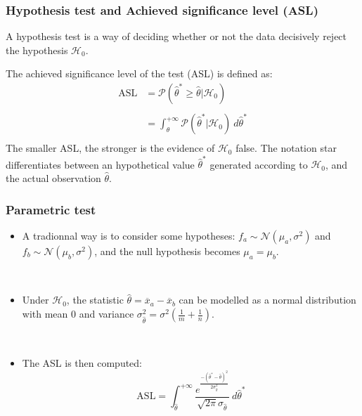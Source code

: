 \frame
{
\frametitle{Hypothesis  test and Achieved significance level (ASL)}

\begin{definition}
A \alert{hypothesis test} is a way of deciding whether or not the data decisively reject the hypothesis $\mathcal{H}_0$. 
\end{definition}

\begin{definition}
The \alert{achieved significance level} of the test (ASL) is defined as:
$$
\begin{array}{ll}
\mathrm{ASL}&= \pmb{\mathcal{P}}(\hat{\theta}^{*}\geq \hat{\theta}|\mathcal{H}_0)\\
&\\
&=\int^{+\infty}_{\hat{\theta}} \mathcal{P}(\hat{\theta}^{*}|\mathcal{H}_0) \ d\hat{\theta}^{*}\\
\end{array}
$$ 
The smaller ASL, the stronger is the evidence of  $\mathcal{H}_0$ false. The notation star differentiates between  an hypothetical value $\hat{\theta}^{*}$ generated according to $\mathcal{H}_0$, and the actual observation $\hat{\theta}$.
\end{definition}
}
\frame
{
\frametitle{Parametric test}

\begin{itemize}

\item A tradionnal way is to consider some hypotheses: $f_a \sim \mathcal{N}(\mu_a, \sigma^2)$ and $f_b \sim \mathcal{N}(\mu_b, \sigma^2)$, and the null hypothesis becomes $\mu_a=\mu_b$. 

\

\item Under $\mathcal{H}_{0}$, the statistic $\hat{\theta}=\overline{x}_a-\overline{x}_b$ can be modelled as a normal distribution with mean 0 and variance $\sigma^2_{\hat{\theta}}=\sigma^2 (\frac{1}{m}+\frac{1}{n})$. 

\

\item The ASL is then computed:
$$
\mathrm{ASL}= \int^{+\infty}_{\hat{\theta}} 
\frac{
e^{ \frac{- (\hat{\theta}^{*}-\hat{\theta} )^{2} } {2\sigma^2_{\hat{\theta}}  }}} {\sqrt{2\pi} \sigma_{\hat{\theta}}} \ 
d\hat{\theta}^{*}
$$

\end{itemize}
}
\frame
